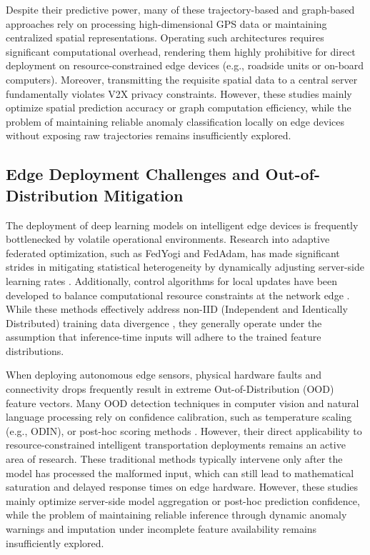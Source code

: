 Despite their predictive power, many of these trajectory-based and graph-based approaches rely on processing high-dimensional GPS data or maintaining centralized spatial representations. Operating such architectures requires significant computational overhead, rendering them highly prohibitive for direct deployment on resource-constrained edge devices (e.g., roadside units or on-board computers). Moreover, transmitting the requisite spatial data to a central server fundamentally violates V2X privacy constraints. However, these studies mainly optimize spatial prediction accuracy or graph computation efficiency, while the problem of maintaining reliable anomaly classification locally on edge devices without exposing raw trajectories remains insufficiently explored.

\subsection{Edge Deployment Challenges and Out-of-Distribution Mitigation}

The deployment of deep learning models on intelligent edge devices is frequently bottlenecked by volatile operational environments. Research into adaptive federated optimization, such as FedYogi and FedAdam, has made significant strides in mitigating statistical heterogeneity by dynamically adjusting server-side learning rates \cite{Yang_2024}. Additionally, control algorithms for local updates have been developed to balance computational resource constraints at the network edge \cite{Wang_2020}. While these methods effectively address non-IID (Independent and Identically Distributed) training data divergence \cite{Lu_2024}, they generally operate under the assumption that inference-time inputs will adhere to the trained feature distributions. 

When deploying autonomous edge sensors, physical hardware faults and connectivity drops frequently result in extreme Out-of-Distribution (OOD) feature vectors. Many OOD detection techniques in computer vision and natural language processing rely on confidence calibration, such as temperature scaling (e.g., ODIN), or post-hoc scoring methods \cite{Shalev_2022}. However, their direct applicability to resource-constrained intelligent transportation deployments remains an active area of research. These traditional methods typically intervene only after the model has processed the malformed input, which can still lead to mathematical saturation and delayed response times on edge hardware. However, these studies mainly optimize server-side model aggregation or post-hoc prediction confidence, while the problem of maintaining reliable inference through dynamic anomaly warnings and imputation under incomplete feature availability remains insufficiently explored.


